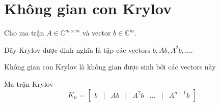 \section*{Không gian con Krylov}
Cho ma trận $A \in \mathbb{C}^{m \times m}$ và vector $b \in \mathbb{C}^m$.

Dãy Krylov được định nghĩa là tập các vectors $b, Ab, A^2b, ...$.

Không gian con Krylov là không gian được sinh bởi các vectors này

Ma trận Krylov
\begin{equation}
    K_n = \begin{bmatrix}
        b & | & Ab & | & A^2b & ... & | & A^{n-1}b
    \end{bmatrix}    
\end{equation}
